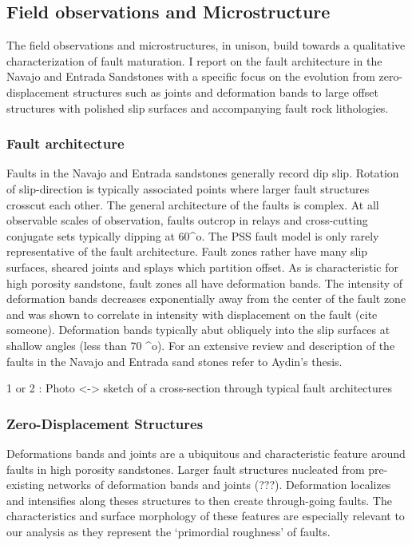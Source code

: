 \documentclass[12pt,a4paper]{article}
\begin{document}
{\begin{landscape}
    \end{landscape}
    \clearpage%

\subsection{Field observations and Microstructure}

The field observations and microstructures, in unison, build towards a qualitative characterization of fault maturation. I report on the fault architecture in the Navajo and Entrada Sandstones with a specific focus on the evolution from zero-displacement structures such as joints and deformation bands to large offset structures with polished slip surfaces and accompanying fault rock lithologies.

\subsubsection{Fault architecture}

Faults in the Navajo and Entrada sandstones generally record dip slip. Rotation of slip-direction is typically associated points where larger fault structures crosscut each other.  The general architecture of the faults is complex. At all observable scales of observation, faults outcrop in relays and cross-cutting conjugate sets typically dipping at 60^o. The PSS fault model is only rarely representative of the fault architecture. Fault zones rather have many slip surfaces, sheared joints and splays which partition offset.  As is characteristic for high porosity sandstone, fault zones all have deformation bands. The intensity of deformation bands decreases exponentially away from the center of the fault zone and was shown to correlate in intensity with displacement on the fault (cite someone). Deformation bands typically abut obliquely into the slip surfaces at shallow angles (less than 70 ^o). For an extensive review and description of the faults in the Navajo and Entrada sand stones refer to Aydin’s thesis.

1 or 2 : Photo <-> sketch  of a cross-section through typical fault architectures

\subsubsection{Zero-Displacement Structures}

Deformations bands and joints are a ubiquitous and characteristic feature around faults in high porosity sandstones. Larger fault structures nucleated from pre-existing networks of deformation bands and joints (\cite{davatzes2000}???). Deformation localizes and intensifies along theses structures to then create through-going faults. The characteristics and surface morphology of these features are especially relevant to our analysis as they represent the ‘primordial roughness’ of faults. 

}
\end{document}
